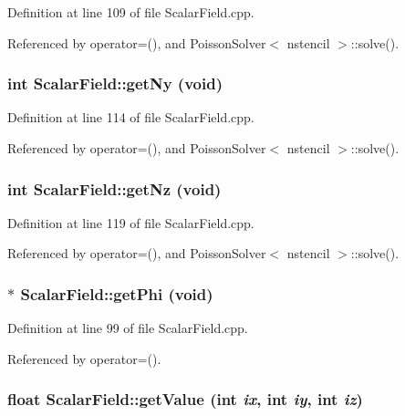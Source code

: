 Definition at line 109 of file ScalarField.cpp.



Referenced by operator=(), and PoissonSolver$<$ nstencil $>$::solve().

\subsubsection[{getNy}]{\setlength{\rightskip}{0pt plus 5cm}int ScalarField::getNy (void)}\label{classScalarField_a39ef61f0794402f2bb1dc2f9c7426968}


Definition at line 114 of file ScalarField.cpp.



Referenced by operator=(), and PoissonSolver$<$ nstencil $>$::solve().

\subsubsection[{getNz}]{\setlength{\rightskip}{0pt plus 5cm}int ScalarField::getNz (void)}\label{classScalarField_ade36f1afaae1779ee940510f495e54b7}


Definition at line 119 of file ScalarField.cpp.



Referenced by operator=(), and PoissonSolver$<$ nstencil $>$::solve().

\subsubsection[{getPhi}]{ $\ast$ ScalarField::getPhi (void)}\label{classScalarField_ad75a79c263b2a3eb2a9aa0962fde0e7e}


Definition at line 99 of file ScalarField.cpp.



Referenced by operator=().

\subsubsection[{getValue}]{\setlength{\rightskip}{0pt plus 5cm}float ScalarField::getValue (int {\em ix}, \/  int {\em iy}, \/  int {\em iz})}\label{classScalarField_ab8291579ca143400e68b82ca4f6dfe40}


